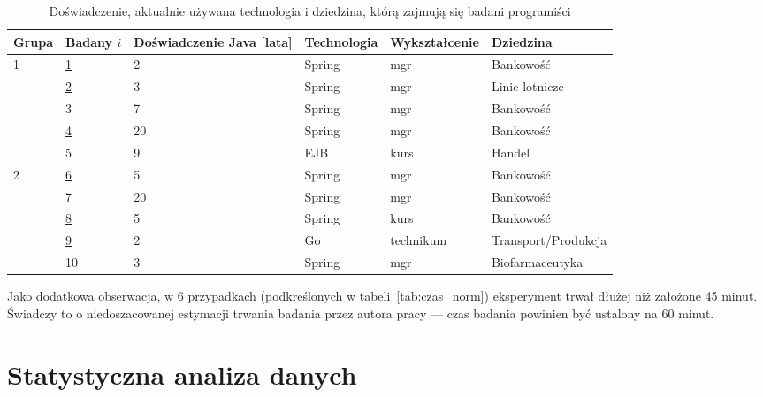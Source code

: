 \begin{table}[h]
    \centering
    \begin{tabular}{l|l|l|l|l|l}
        Grupa              & Badany \(i\)  & Doświadczenie Java [lata] & Technologia & Wykształcenie & Dziedzina
        \\ \hline\hline
        \multirow{5}{*}{1} & \underline{1} & 2                         & Spring      & mgr           & Bankowość
        \\
        & \underline{2} & 3                         & Spring      & mgr           & Linie lotnicze      \\
        & 3             & 7                         & Spring      & mgr           & Bankowość           \\
        & \underline{4} & 20                        & Spring      & mgr           & Bankowość           \\
        & 5             & 9                         & EJB         & kurs          & Handel              \\ \hline
        \multirow{5}{*}{2} & \underline{6} & 5                         & Spring      & mgr           & Bankowość
        \\
        & 7             & 20                        & Spring      & mgr           & Bankowość           \\
        & \underline{8} & 5                         & Spring      & kurs          & Bankowość           \\
        & \underline{9} & 2                         & Go          & technikum     & Transport/Produkcja \\
        & 10            & 3                         & Spring      & mgr           & Biofarmaceutyka     \\ \hline
    \end{tabular}
    \caption{\label{tab:demografia}Doświadczenie, aktualnie używana technologia i dziedzina,
        którą zajmują się badani programiści}
\end{table}

Jako dodatkowa obserwacja, w 6 przypadkach (podkreślonych w tabeli~\ref{tab:czas_norm}) eksperyment trwał dłużej niż
założone 45 minut.
Świadczy to o niedoszacowanej estymacji trwania badania przez autora pracy --- czas badania powinien być ustalony na 60
minut.


\section{Statystyczna analiza danych}

